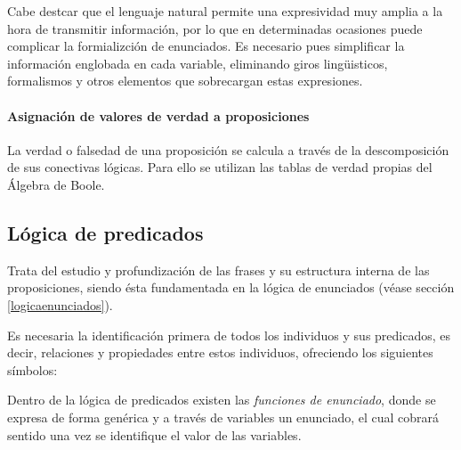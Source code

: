 \documentclass[a4paper, 11pt, titlepage]{article}
\begin{document}
                Cabe destcar que el lenguaje natural permite una expresividad muy amplia a la hora de 
                transmitir información, por lo que en determinadas ocasiones puede complicar la 
                formializción de enunciados. Es necesario pues simplificar la información englobada en 
                cada variable, eliminando giros lingüisticos, formalismos y otros elementos que 
                sobrecargan estas expresiones.

            \paragraph{Asignación de valores de verdad a proposiciones}

                La verdad o falsedad de una proposición se calcula a través de la descomposición
                de sus conectivas lógicas. Para ello se utilizan las tablas de verdad propias del 
                Álgebra de Boole. 


    \subsection{Lógica de predicados}

        Trata del estudio y profundización de las frases y su estructura interna de las proposiciones, 
        siendo ésta fundamentada en la lógica de enunciados (véase sección \ref{logicaenunciados}).

        Es necesaria la identificación primera de todos los individuos y sus predicados, es decir, 
        relaciones y propiedades entre estos individuos, ofreciendo los siguientes símbolos:

        Dentro de la lógica de predicados existen las \textit{funciones de enunciado}, donde se expresa 
        de forma genérica y a través de variables un enunciado, el cual cobrará sentido una vez se 
        identifique el valor de las variables.
\end{document}
